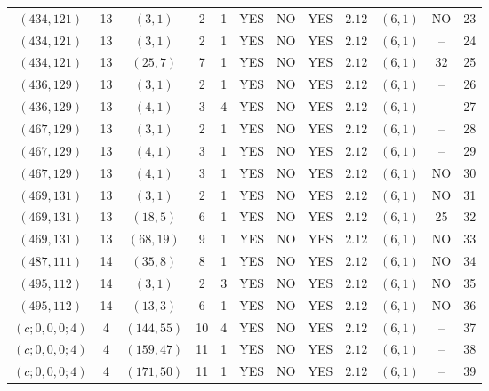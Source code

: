 \begin{longtable}{|c|c|c|c|c|c|c|c|c|c|c|c|}
$(434,121)$ & 13 & $(3,1)$ & 2 & 1 & YES & NO & YES & $2.12$ & $(6,1)$ & NO & 23\\
$(434,121)$ & 13 & $(3,1)$ & 2 & 1 & YES & NO & YES & $2.12$ & $(6,1)$ & -- & 24\\
$(434,121)$ & 13 & $(25,7)$ & 7 & 1 & YES & NO & YES & $2.12$ & $(6,1)$ & 32 & 25\\
$(436,129)$ & 13 & $(3,1)$ & 2 & 1 & YES & NO & YES & $2.12$ & $(6,1)$ & -- & 26\\
$(436,129)$ & 13 & $(4,1)$ & 3 & 4 & YES & NO & YES & $2.12$ & $(6,1)$ & -- & 27\\
$(467,129)$ & 13 & $(3,1)$ & 2 & 1 & YES & NO & YES & $2.12$ & $(6,1)$ & -- & 28\\
$(467,129)$ & 13 & $(4,1)$ & 3 & 1 & YES & NO & YES & $2.12$ & $(6,1)$ & -- & 29\\
$(467,129)$ & 13 & $(4,1)$ & 3 & 1 & YES & NO & YES & $2.12$ & $(6,1)$ & NO & 30\\
$(469,131)$ & 13 & $(3,1)$ & 2 & 1 & YES & NO & YES & $2.12$ & $(6,1)$ & NO & 31\\
$(469,131)$ & 13 & $(18,5)$ & 6 & 1 & YES & NO & YES & $2.12$ & $(6,1)$ & 25 & 32\\
$(469,131)$ & 13 & $(68,19)$ & 9 & 1 & YES & NO & YES & $2.12$ & $(6,1)$ & NO & 33\\
$(487,111)$ & 14 & $(35,8)$ & 8 & 1 & YES & NO & YES & $2.12$ & $(6,1)$ & NO & 34\\
$(495,112)$ & 14 & $(3,1)$ & 2 & 3 & YES & NO & YES & $2.12$ & $(6,1)$ & NO & 35\\
$(495,112)$ & 14 & $(13,3)$ & 6 & 1 & YES & NO & YES & $2.12$ & $(6,1)$ & NO & 36\\
$(c;0,0,0;4)$ & 4 & $(144,55)$ & 10 & 4 & YES & NO & YES & $2.12$ & $(6,1)$ & -- & 37\\
$(c;0,0,0;4)$ & 4 & $(159,47)$ & 11 & 1 & YES & NO & YES & $2.12$ & $(6,1)$ & -- & 38\\
$(c;0,0,0;4)$ & 4 & $(171,50)$ & 11 & 1 & YES & NO & YES & $2.12$ & $(6,1)$ & -- & 39
\end{longtable}
